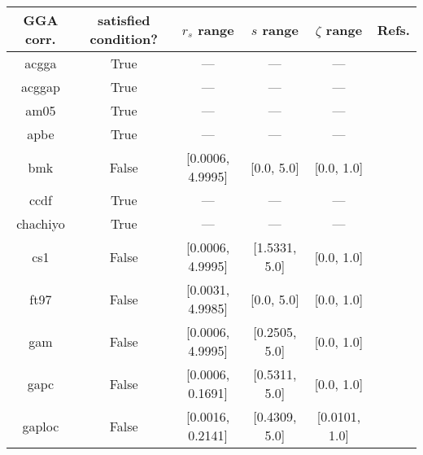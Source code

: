 \begin{tabular}{|c|c|c|c|c|l|}
\hline
     GGA corr. &  satisfied condition? &      $r_s$ range &        $s$ range & $\zeta$ range  &                                                          Refs. \\ \hline
         acgga &                  True &              --- &              --- &            --- &                        \cite{Cancio2018_084116,Burke2014_4834} \\ \hline
        acggap &                  True &              --- &              --- &            --- &                        \cite{Cancio2018_084116,Burke2014_4834} \\ \hline
          am05 &                  True &              --- &              --- &            --- &                 \cite{Armiento2005_085108,Mattsson2008_084714} \\ \hline
          apbe &                  True &              --- &              --- &            --- &                                   \cite{Constantin2011_186406} \\ \hline
           bmk &                 False & [0.0006, 4.9995] &       [0.0, 5.0] &     [0.0, 1.0] &                                          \cite{Boese2004_3405} \\ \hline
          ccdf &                  True &              --- &              --- &            --- &                                      \cite{Margraf2019_244116} \\ \hline
      chachiyo &                  True &              --- &              --- &            --- &                                     \cite{Chachiyo2020_112669} \\ \hline
           cs1 &                 False & [0.0006, 4.9995] &    [1.5331, 5.0] &     [0.0, 1.0] &                          \cite{Handy2002_5411,Proynov2006_436} \\ \hline
          ft97 &                 False & [0.0031, 4.9985] &       [0.0, 5.0] &     [0.0, 1.0] &                         \cite{Filatov1997_603,Filatov1997_847} \\ \hline
           gam &                 False & [0.0006, 4.9995] &    [0.2505, 5.0] &     [0.0, 1.0] &                                            \cite{Yu2015_12146} \\ \hline
          gapc &                 False & [0.0006, 0.1691] &    [0.5311, 5.0] &     [0.0, 1.0] &                                        \cite{Fabiano2014_2016} \\ \hline
        gaploc &                 False & [0.0016, 0.2141] &    [0.4309, 5.0] &  [0.0101, 1.0] &                                        \cite{Fabiano2014_2016} \\ \hline

\end{tabular}
